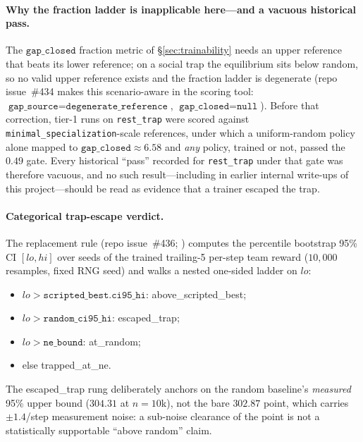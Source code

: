 \documentclass{anvil-paper}
\begin{document}
\paragraph{Why the fraction ladder is inapplicable here---and a vacuous
historical pass.}
The $\texttt{gap\_closed}$ fraction metric of \S\ref{sec:trainability}
needs an upper reference that beats its lower reference; on a social
trap the equilibrium sits below random, so no valid upper reference
exists and the fraction ladder is degenerate (repo issue~\#434 makes
this scenario-aware in the scoring tool:
$\texttt{gap\_source}{=}\texttt{degenerate\_reference}$,
$\texttt{gap\_closed}{=}\texttt{null}$). Before that correction, tier-1
runs on \texttt{rest\_trap} were scored against
\texttt{minimal\_specialization}-scale references, under which a
uniform-random policy alone mapped to $\texttt{gap\_closed}\approx 6.58$
and \emph{any} policy, trained or not, passed the $0.49$ gate. Every
historical ``pass'' recorded for \texttt{rest\_trap} under that gate was
therefore vacuous, and no such result---including in earlier internal
write-ups of this project---should be read as evidence that a trainer
escaped the trap.

\paragraph{Categorical trap-escape verdict.}
The replacement rule (repo issue~\#436;
) computes the
percentile bootstrap 95\% CI $[lo, hi]$ over seeds of the trained
trailing-5 per-step team reward ($10{,}000$ resamples, fixed RNG seed)
and walks a nested one-sided ladder on $lo$:
\begin{itemize}
  \item $lo > \texttt{scripted\_best.ci95\_hi}$:
        \textsf{above\_scripted\_best};
  \item $lo > \texttt{random\_ci95\_hi}$: \textsf{escaped\_trap};
  \item $lo > \texttt{ne\_bound}$: \textsf{at\_random};
  \item else \textsf{trapped\_at\_ne}.
\end{itemize}
The \textsf{escaped\_trap} rung deliberately
anchors on the random baseline's \emph{measured} 95\% upper bound
($304.31$ at $n{=}10$k), not the bare $302.87$ point, which carries
${\pm}1.4$/step measurement noise: a sub-noise clearance of the point is
not a statistically supportable ``above random'' claim.
\end{document}
